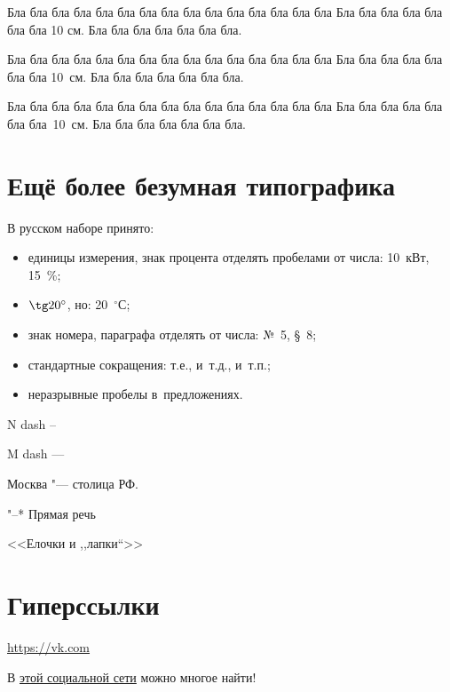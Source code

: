 \documentclass[12pt, a4paper]{article}
\begin{document}
Бла бла бла бла бла бла бла бла бла бла бла бла бла бла бла Бла бла бла бла бла бла бла  10 см. Бла бла бла бла бла бла бла.

\vspace{2mm}

Бла бла бла бла бла бла бла бла бла бла бла бла бла бла бла Бла бла бла бла бла бла бла  10~см. Бла бла бла бла бла бла бла.

\vspace{2mm}

Бла бла бла бла бла бла бла бла бла бла бла бла бла бла бла Бла бла бла бла бла бла бла~10~см. Бла бла бла бла бла бла бла.


\section{Ещё более безумная типографика}



В русском наборе принято:
\begin{itemize}
   \item единицы измерения, знак процента отделять пробелами от числа: 10~кВт, 15~\%;
   \item $\tg 20^\circ$, но: 20~${}^\circ$С;
   \item знак номера, параграфа отделять от числа: №~5, \S~8;
   \item стандартные сокращения: т.\:е., и~т.\:д., и~т.\:п.;
   \item неразрывные пробелы в~предложениях.
\end{itemize}


N dash --

M dash ---

Москва "--- столица РФ.

"--* Прямая речь

<<Елочки и ,,лапки``>>

\section{Гиперссылки}

\url{https://vk.com}

В \href{https://vk.com}{этой социальной сети} можно многое найти!
\end{document}
